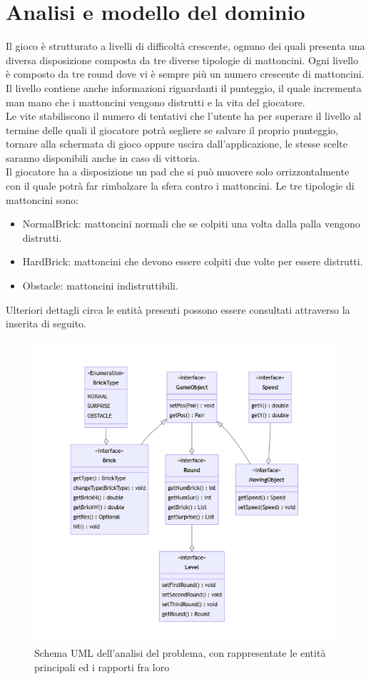\documentclass[a4paper,12pt]{report}
\begin{document}
\section{Analisi e modello del dominio}
Il gioco è strutturato a livelli di difficoltà crescente, ognuno dei quali presenta una diversa disposizione composta da tre diverse tipologie di mattoncini. Ogni livello è composto da tre round dove vi è sempre più un numero crescente di mattoncini.
Il livello contiene anche informazioni riguardanti il punteggio, il quale incrementa man mano che i mattoncini vengono distrutti e la vita del giocatore.
\\Le vite stabiliscono il numero di tentativi che l'utente ha per superare il livello al termine delle quali il giocatore potrà segliere se salvare il proprio punteggio, tornare alla schermata di gioco oppure uscira dall'applicazione, le stesse scelte saranno disponibili anche in caso di vittoria.
\\Il giocatore ha a disposizione un pad che si può muovere solo orrizzontalmente con il quale potrà far rimbalzare la sfera contro i mattoncini. 
Le tre tipologie di mattoncini sono:
\begin{itemize}
\item NormalBrick: mattoncini normali che se colpiti una volta dalla palla vengono distrutti.
\item HardBrick: mattoncini che devono essere colpiti due volte per essere distrutti.
\item Obstacle: mattoncini indistruttibili.
\end{itemize}
Ulteriori dettagli circa le entità presenti possono essere consultati attraverso la  inserita di seguito.
\begin{figure}[H]
    \centering{}
    \includegraphics{images/analysis.png}
    \caption{Schema UML dell'analisi del problema, con rappresentate le entità principali ed i rapporti fra loro}
    \label{images:analysis}
    \end{figure}
\end{document}
